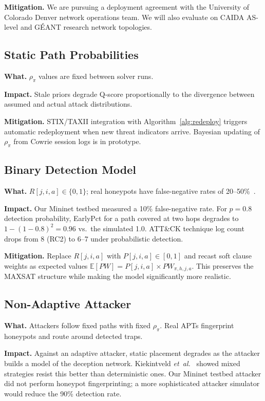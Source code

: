 \documentclass[journal]{IEEEtran}
\newcommand{\etal}{\emph{et~al.}}
\begin{document}
\textbf{Mitigation.}
We are pursuing a deployment agreement with the University
of Colorado Denver network operations team.
We will also evaluate on CAIDA AS-level and GÉANT research
network topologies.

\subsection{Static Path Probabilities}

\textbf{What.}
$\rho_\pi$ values are fixed between solver runs.

\textbf{Impact.}
Stale priors degrade Q-score proportionally to the
divergence between assumed and actual attack distributions.

\textbf{Mitigation.}
STIX/TAXII integration with Algorithm~\ref{alg:redeploy}
triggers automatic redeployment when new threat indicators
arrive.
Bayesian updating of $\rho_\pi$ from Cowrie session logs
is in prototype.

\subsection{Binary Detection Model}

\textbf{What.}
$R[j,i,a]\in\{0,1\}$; real honeypots have false-negative
rates of 20--50\%~\cite{huang2019}.

\textbf{Impact.}
Our Mininet testbed measured a 10\% false-negative rate.
For $p=0.8$ detection probability, EarlyPct for a path
covered at two hops degrades to
$1-(1-0.8)^2=0.96$ vs.\ the simulated 1.0.
ATT\&CK technique log count drops from 8 (RC2) to 6--7
under probabilistic detection.

\textbf{Mitigation.}
Replace $R[j,i,a]$ with $P[j,i,a]\in[0,1]$ and recast
soft clause weights as expected values
$\mathbb{E}[PW]=P[j,i,a]\times PW_{\pi,h,j,a}$.
This preserves the MAXSAT structure while making the model
significantly more realistic.

\subsection{Non-Adaptive Attacker}

\textbf{What.}
Attackers follow fixed paths with fixed $\rho_\pi$.
Real APTs fingerprint honeypots and route around detected
traps.

\textbf{Impact.}
Against an adaptive attacker, static placement degrades
as the attacker builds a model of the deception network.
Kiekintveld \etal{}~\cite{kiekintveld2015} showed mixed
strategies resist this better than deterministic ones.
Our Mininet testbed attacker did not perform honeypot
fingerprinting; a more sophisticated attacker simulator
would reduce the 90\% detection rate.
\end{document}
